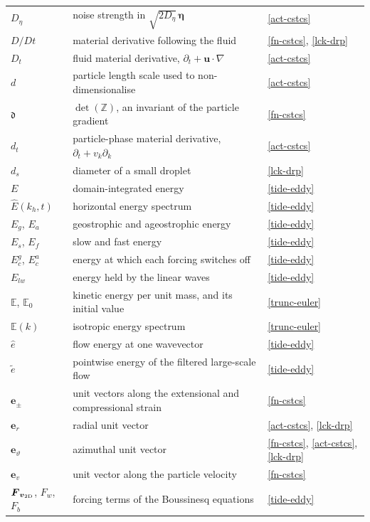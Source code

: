 \begin{longtable}{@{}p{}p{}p{}@{}}
$D_\eta$ & noise strength in $\sqrt{2D_\eta}\,\boldsymbol{\eta}$ & \ref{act-cstcs} \\
$D/Dt$ & material derivative following the fluid & \ref{fn-cstcs}, \ref{lck-drp} \\
$D_t$ & fluid material derivative, $\partial_t + \boldsymbol{u}\cdot\nabla$ & \ref{act-cstcs} \\
$d$ & particle length scale used to non-dimensionalise & \ref{act-cstcs} \\
$\mathfrak{d}$ & $\det(\mathbb{Z})$, an invariant of the particle gradient & \ref{fn-cstcs} \\
$d_t$ & particle-phase material derivative, $\partial_t + v_k\partial_k$ & \ref{act-cstcs} \\
$d_s$ & diameter of a small droplet & \ref{lck-drp} \\
\addlinespace
$E$ & domain-integrated energy & \ref{tide-eddy} \\
$\widehat{E}(k_h,t)$ & horizontal energy spectrum & \ref{tide-eddy} \\
$E_g$, $E_a$ & geostrophic and ageostrophic energy & \ref{tide-eddy} \\
$E_s$, $E_f$ & slow and fast energy & \ref{tide-eddy} \\
$E_c^g$, $E_c^a$ & energy at which each forcing switches off & \ref{tide-eddy} \\
$E_{lw}$ & energy held by the linear waves & \ref{tide-eddy} \\
$\mathbb{E}$, $\mathbb{E}_0$ & kinetic energy per unit mass, and its initial value & \ref{trunc-euler} \\
$\mathbb{E}(k)$ & isotropic energy spectrum & \ref{trunc-euler} \\
$\widehat{e}$ & flow energy at one wavevector & \ref{tide-eddy} \\
$\widetilde{e}$ & pointwise energy of the filtered large-scale flow & \ref{tide-eddy} \\
$\boldsymbol{e}_\pm$ & unit vectors along the extensional and compressional strain & \ref{fn-cstcs} \\
$\boldsymbol{e}_r$ & radial unit vector & \ref{act-cstcs}, \ref{lck-drp} \\
$\boldsymbol{e}_\vartheta$ & azimuthal unit vector & \ref{fn-cstcs}, \ref{act-cstcs}, \ref{lck-drp} \\
$\boldsymbol{e}_v$ & unit vector along the particle velocity & \ref{fn-cstcs} \\
\addlinespace
$\boldsymbol{F}_{\boldsymbol{v}_{\rm 2D}}$, $F_w$, $F_b$ & forcing terms of the Boussinesq equations & \ref{tide-eddy} \\

\end{longtable}
